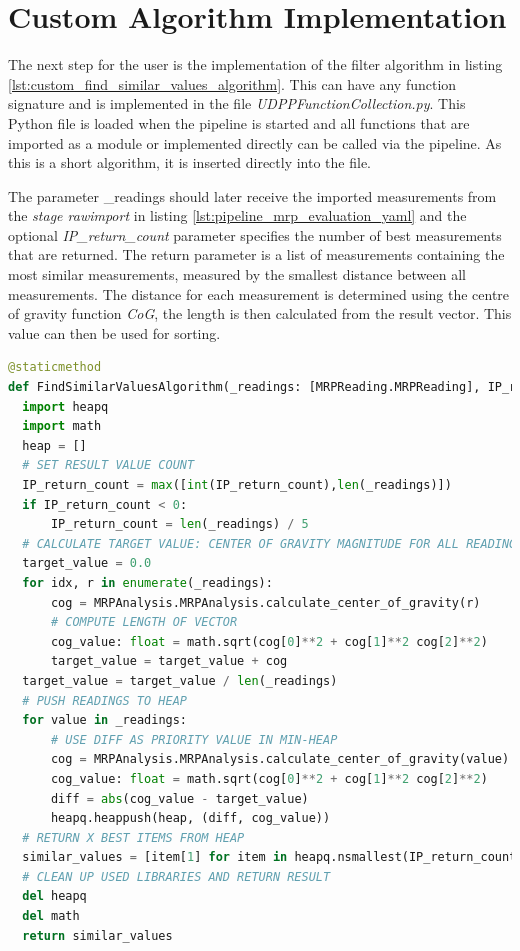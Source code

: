 \hypertarget{custom-algorithm-implementation}{%
\section{Custom Algorithm
Implementation}\label{custom-algorithm-implementation}}

The next step for the user is the implementation of the filter algorithm
in listing \ref{lst:custom_find_similar_values_algorithm}. This can have
any function signature and is implemented in the file
\emph{UDPPFunctionCollection.py}. This Python file is loaded when the
pipeline is started and all functions that are imported as a module or
implemented directly can be called via the pipeline. As this is a short
algorithm, it is inserted directly into the file.

The parameter \_readings should later receive the imported measurements
from the \emph{stage rawimport} in listing
\ref{lst:pipeline_mrp_evaluation_yaml} and the optional
\emph{IP\_return\_count} parameter specifies the number of best
measurements that are returned. The return parameter is a list of
measurements containing the most similar measurements, measured by the
smallest distance between all measurements. The distance for each
measurement is determined using the centre of gravity function
\emph{CoG}, the length is then calculated from the result vector. This
value can then be used for sorting.

\begin{lstlisting}[language=Python, caption={User implemented custom find most similar readings algorithm}, label=lst:custom_find_similar_values_algorithm]
@staticmethod
def FindSimilarValuesAlgorithm(_readings: [MRPReading.MRPReading], IP_return_count: int = -1) -> [MRPReading.MRPReading]:
  import heapq
  import math
  heap = []
  # SET RESULT VALUE COUNT
  IP_return_count = max([int(IP_return_count),len(_readings)])
  if IP_return_count < 0:
      IP_return_count = len(_readings) / 5
  # CALCULATE TARGET VALUE: CENTER OF GRAVITY MAGNITUDE FOR ALL READINGS
  target_value = 0.0
  for idx, r in enumerate(_readings):
      cog = MRPAnalysis.MRPAnalysis.calculate_center_of_gravity(r)
      # COMPUTE LENGTH OF VECTOR
      cog_value: float = math.sqrt(cog[0]**2 + cog[1]**2 cog[2]**2)
      target_value = target_value + cog
  target_value = target_value / len(_readings)
  # PUSH READINGS TO HEAP
  for value in _readings:
      # USE DIFF AS PRIORITY VALUE IN MIN-HEAP
      cog = MRPAnalysis.MRPAnalysis.calculate_center_of_gravity(value)
      cog_value: float = math.sqrt(cog[0]**2 + cog[1]**2 cog[2]**2)
      diff = abs(cog_value - target_value)
      heapq.heappush(heap, (diff, cog_value))
  # RETURN X BEST ITEMS FROM HEAP
  similar_values = [item[1] for item in heapq.nsmallest(IP_return_count, heap)]
  # CLEAN UP USED LIBRARIES AND RETURN RESULT
  del heapq
  del math
  return similar_values
\end{lstlisting}


